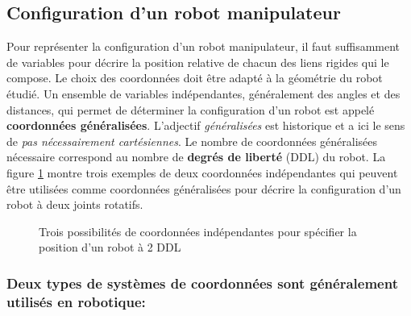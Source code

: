 \subsection{Configuration d'un robot manipulateur}
Pour représenter la configuration d'un robot manipulateur, il faut suffisamment de variables pour décrire la position relative de chacun des liens rigides qui le compose. Le choix des coordonnées doit être adapté à la géométrie du robot étudié. Un ensemble de variables indépendantes, généralement des angles et des distances, qui permet de déterminer la configuration d'un robot est appelé \textbf{coordonnées généralisées}. L'adjectif \textit{généralisées} est historique et a ici le sens de \textit{pas nécessairement cartésiennes}. Le nombre de coordonnées généralisées nécessaire correspond au nombre de \textbf{degrés de liberté} (DDL) du robot.
La figure \ref{fig:coor} montre trois exemples de deux coordonnées indépendantes qui peuvent être utilisées comme coordonnées généralisées pour décrire la configuration d'un robot à deux joints rotatifs.

\begin{figure}[htbp]
	\centering
	\vspace{10pt}
	\vspace{10pt}
	\vspace{-10pt}
	\caption{Trois possibilités de coordonnées indépendantes pour spécifier la position d'un robot à 2 DDL}
	\label{fig:coor}
\end{figure}


\subsubsection{Deux types de systèmes de coordonnées sont généralement utilisés en robotique:}

